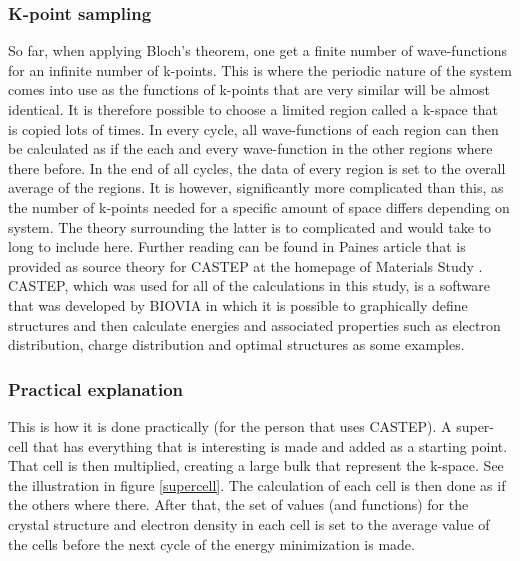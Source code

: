 \documentclass[10pt,a4paper]{article}
\begin{document}
\subsubsection{K-point sampling}
So far, when applying Bloch's theorem, one get a finite number of wave-functions for an infinite number of k-points. This is where the periodic nature of the system comes into use as the functions of k-points that are very similar will be almost identical. It is therefore possible to choose a limited region called a k-space that is copied lots of times. In every cycle, all wave-functions of each region can then be calculated as if the each and every wave-function in the other regions  where there before. In the end of all cycles, the data of every region is set to the overall average of the regions. It is however, significantly more complicated than this, as the number of k-points needed for a specific amount of space differs depending on system. The theory surrounding the latter is to complicated and would take to long to include here. Further reading can be found in Paines article that is provided as source theory for CASTEP at the homepage of Materials Study \cite{paine}. CASTEP, which was used for all of the calculations in this study, is a software that was developed by BIOVIA in which it is possible to graphically  define structures and then calculate energies and associated properties such as electron distribution, charge distribution and optimal structures as some examples. 

\subsubsection{Practical explanation}
This is how it is done practically (for the person that uses CASTEP). A super-cell that has everything that is interesting is made and added as a starting point. That cell is then multiplied, creating a large bulk that represent the k-space. See the illustration in figure \ref{supercell}. The calculation of each cell is then done as if the others where there. After that, the set of values (and functions) for the crystal structure and electron density in each cell is set to the average value of the cells before the next cycle of the energy minimization is made.
\end{document}

